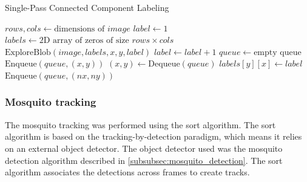 \begin{algorithm}[H]
    \caption{Single-Pass Connected Component Labeling}
    \label{alg:single_pass_ccl}
    \begin{algorithmic}[1]
        \State $rows, cols \gets \text{dimensions of } image$
        \State $label \gets 1$
        \State $labels \gets \text{2D array of zeros of size } rows \times cols$
        \State $\text{ExploreBlob}(image, labels, x, y, label)$
        \State $label \gets label + 1$
        \EndIf
        \EndFor
        \EndFor
        \EndProcedure
        \State
        \State $queue \gets \text{empty queue}$
        \State $\text{Enqueue}(queue, (x, y))$
        \State $(x, y) \gets \text{Dequeue}(queue)$
        \State {}
        \EndIf
        \State $labels[y][x] \gets label$
        \State $\text{Enqueue}(queue, (nx, ny))$
        \EndFor
        \EndWhile
        \EndProcedure
    \end{algorithmic}
\end{algorithm}


\subsubsection{Mosquito tracking}

The mosquito tracking was performed using the \gls{sort} algorithm. The \gls{sort} algorithm is based on the tracking-by-detection paradigm, which means it relies on an external object detector. The object detector used was the mosquito detection algorithm described in \autoref{subsubsec:mosquito_detection}. The \gls{sort} algorithm associates the detections across frames to create tracks.

